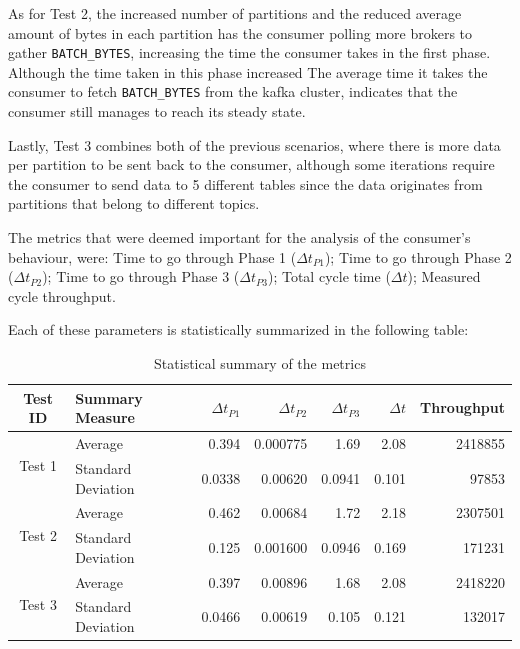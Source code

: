 As for Test 2, the increased number of partitions and the reduced average amount
of bytes in each partition has the consumer polling more brokers to gather
\lstinline[language=Python]{BATCH_BYTES}, increasing the time the consumer takes
in the first phase. Although the time taken in this phase increased The average
time it takes the consumer to fetch \lstinline[language=Python]{BATCH_BYTES}
from the kafka cluster, indicates that the consumer still manages to reach its
steady state.

Lastly, Test 3 combines both of the previous scenarios, where there is more data
per partition to be sent back to the consumer, although some iterations require
the consumer to send data to 5 different tables since the data originates from
partitions that belong to different topics.

The metrics that were deemed important for the analysis of the consumer's
behaviour, were: Time to go through Phase 1 ($\Delta t_{P1}$); Time to go
through Phase 2 ($\Delta t_{P2}$); Time to go through Phase 3 ($\Delta t_{P3}$);
Total cycle time ($\Delta t$); Measured cycle throughput.

Each of these parameters is statistically summarized in the following table:
\begin{table}[H] 
\centering 
\caption{Statistical summary of the metrics }
    \begin{tabular}{ |c|l|r|r|r|r|r| } 
        \hline 
        \textbf{Test ID} & \textbf{Summary Measure} & \textbf{$\Delta t_{P1}$} &
            \textbf{$\Delta t_{P2}$} & \textbf{$\Delta t_{P3}$} & \textbf{$\Delta t$} & \textbf{Throughput} \\ 
            \hline
            \multirow{2}{*}{Test 1} 
            & Average & 0.394  & 0.000775 & 1.69 & 2.08 & 2418855 \\ 
            & Standard Deviation & 0.0338 & 0.00620  & 0.0941 & 0.101 & 97853 \\ 
            \hline 
            \multirow{2}{*}{Test 2} 
            & Average & 0.462 & 0.00684 & 1.72 & 2.18 & 2307501 \\ 
            & Standard Deviation & 0.125 & 0.001600  & 0.0946 & 0.169 & 171231 \\ 
            \hline \multirow{2}{*}{Test 3} 
            & Average & 0.397  & 0.00896 & 1.68 & 2.08 & 2418220 \\ 
            &  Standard Deviation & 0.0466 & 0.00619 & 0.105 & 0.121 & 132017 \\ 
    \hline 
    \end{tabular} 
\end{table}

